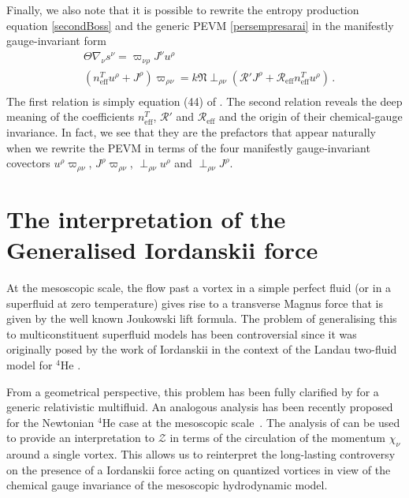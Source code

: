 \documentclass[preprints,article,accept,moreauthors,pdftex]{mdpi}
\begin{document}
Finally, we also note that it is possible to rewrite the entropy production equation \eqref{secondBoss} and the generic PEVM \eqref{persempresarai} in the manifestly gauge-invariant form
\begin{equation}
    \begin{split}
        & \Theta \nabla_\nu s^\nu = \varpi_{\nu \rho} J^\nu u^\rho \\
        & (n^T_{\text{eff}} u^\rho +J^\rho)\varpi_{\rho \nu} = k \mathfrak{N} {\perp}_{\rho \nu}(\mathcal{R}' J^\rho + \mathcal{R}_{\text{eff}} n^T_{\text{eff}} u^\rho) \, . \\
    \end{split}
\end{equation}
The first relation is simply equation (44) of \citet{GusakovHVBK}. The second relation reveals the deep meaning of the coefficients $n^T_{\text{eff}}$, $ \mathcal{R}'$ and $\mathcal{R}_{\text{eff}}$ and the origin of their chemical-gauge invariance. In fact, we see that they are the prefactors that appear naturally when we rewrite the PEVM in terms of the four manifestly gauge-invariant covectors $u^\rho \varpi_{\rho \nu}$, 
$J^\rho \varpi_{\rho \nu}$, ${\perp}_{\rho \nu} u^\rho$ and ${\perp}_{\rho \nu} J^\rho$.


\section{The interpretation of the Generalised Iordanskii force}
\label{sezione5}

At the mesoscopic scale, the flow past a vortex in a simple perfect fluid (or in a superfluid at zero temperature) gives rise to a transverse Magnus force that is given by the well known Joukowski lift formula. 
The problem of generalising this to multiconstituent superfluid models has been controversial since it was originally posed by the work of Iordanskii in the context of the Landau two-fluid model for $^4$He \cite{donnelly_book,sonin_book_2016,sourie2020IJMPB}. 

From a geometrical perspective, this problem has been fully clarified by \citet{Carter_Prix_Magnus} for a  generic relativistic multifluid. An analogous analysis has been recently proposed for the Newtonian $^4$He case at the mesoscopic scale~\cite{sourie2020IJMPB}.
The analysis of \cite{Carter_Prix_Magnus}  can be used to provide an interpretation to $\mathcal{Z}$ in terms of the circulation of the momentum $\chi_\nu$ around a single vortex. 
This allows us to reinterpret the long-lasting controversy on the presence of a Iordanskii force acting on quantized vortices in view of  the chemical gauge invariance of the mesoscopic hydrodynamic model.
\end{document}
